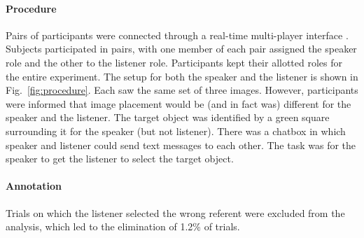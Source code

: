 \documentclass[10pt,letterpaper]{article}
\newcommand{\figref}[1]{Fig.~\ref{#1}}
\begin{document}
\paragraph{\bf Procedure}
Pairs of participants were connected through a real-time multi-player interface \cite{Hawkins15_RealTimeWebExperiments}. Subjects participated in pairs, with one member of each pair assigned the speaker role and the other to the listener role. Participants kept their allotted roles for the entire experiment. 
The setup for both the speaker and the listener is shown in \figref{fig:procedure}. Each saw the same set of three images. However, participants were informed that image placement would be (and in fact was) different for the speaker and the listener. The target object was identified by a green square surrounding it for the speaker (but not listener). There was a chatbox in which speaker and listener could send text messages to each other. The task was for the speaker to get the listener to select the target object. %

\paragraph{\bf Annotation}
Trials on which the listener selected the wrong referent were excluded from the analysis, which led to the elimination of 1.2\% of trials.
 
\end{document}

